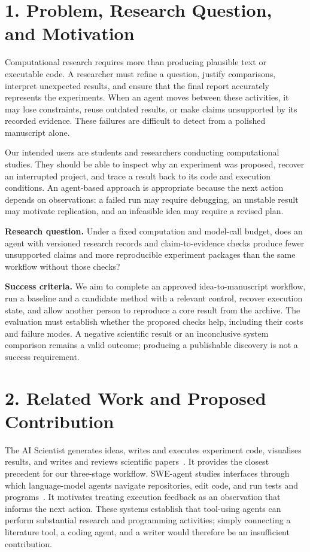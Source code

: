 \documentclass[11pt]{article}
\begin{document}
\section*{1. Problem, Research Question, and Motivation}

Computational research requires more than producing plausible text or executable code. A researcher must refine a question, justify comparisons, interpret unexpected results, and ensure that the final report accurately represents the experiments. When an agent moves between these activities, it may lose constraints, reuse outdated results, or make claims unsupported by its recorded evidence. These failures are difficult to detect from a polished manuscript alone.

Our intended users are students and researchers conducting computational studies. They should be able to inspect why an experiment was proposed, recover an interrupted project, and trace a result back to its code and execution conditions. An agent-based approach is appropriate because the next action depends on observations: a failed run may require debugging, an unstable result may motivate replication, and an infeasible idea may require a revised plan.

\noindent\textbf{Research question.} Under a fixed computation and model-call budget, does an agent with versioned research records and claim-to-evidence checks produce fewer unsupported claims and more reproducible experiment packages than the same workflow without those checks?

\noindent\textbf{Success criteria.} We aim to complete an approved idea-to-manuscript workflow, run a baseline and a candidate method with a relevant control, recover execution state, and allow another person to reproduce a core result from the archive. The evaluation must establish whether the proposed checks help, including their costs and failure modes. A negative scientific result or an inconclusive system comparison remains a valid outcome; producing a publishable discovery is not a success requirement.

\section*{2. Related Work and Proposed Contribution}

The AI Scientist generates ideas, writes and executes experiment code, visualises results, and writes and reviews scientific papers~\cite{lu2024aiscientist}. It provides the closest precedent for our three-stage workflow. SWE-agent studies interfaces through which language-model agents navigate repositories, edit code, and run tests and programs~\cite{yang2024sweagent}. It motivates treating execution feedback as an observation that informs the next action. These systems establish that tool-using agents can perform substantial research and programming activities; simply connecting a literature tool, a coding agent, and a writer would therefore be an insufficient contribution.
\end{document}
